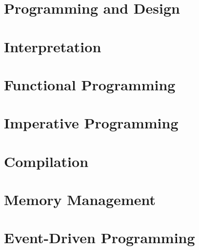 % 

\chapter{Programming and Design}
\label{chapter-interpretation1}
\setcounter{excounter}{1}


\chapter{Interpretation}
\label{chapter-interpretation2}
\setcounter{excounter}{1}


\chapter{Functional Programming}
\label{chapter-functional}
\setcounter{excounter}{1}


\chapter{Imperative Programming}
\label{chapter-nonfunctional}
\setcounter{excounter}{1}


\chapter{Compilation}
\label{chapter-compilation}
\setcounter{excounter}{1}


\chapter{Memory Management}
\label{chapter-memory}
\setcounter{excounter}{1}


\chapter{Event-Driven Programming}
\label{chapter-events}
\setcounter{excounter}{1}


